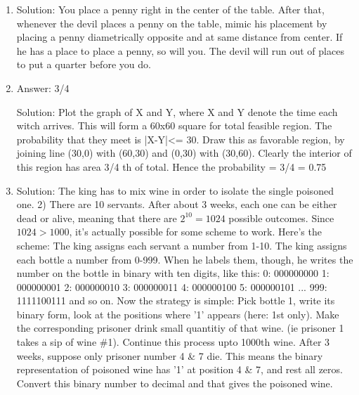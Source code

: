 \begin{enumerate}

\item
Solution: You place a penny right in the center of the table. After that, whenever the devil places a penny on the table, mimic his placement by placing a penny diametrically opposite and at same distance from center. If he has a place to place a penny, so will you. The devil will run out of places to put a quarter before you do.




\item
Answer: 3/4
 
Solution: Plot the graph of X and Y, where X and Y denote the time each witch arrives. This will form a 60x60 square for total feasible region. The probability that they meet is |X-Y|<= 30. Draw this as favorable region, by joining line (30,0) with (60,30) and (0,30) with (30,60). Clearly the interior of this region has area 3/4 th of total. Hence the probability = 3/4 = 0.75




\item
Solution: The king has to mix wine in order to isolate the single poisoned one. 2) There are 10 servants. After about 3 weeks, each one can be either dead or alive, meaning that there are $2^10 = 1024$ possible outcomes. Since $1024 > 1000$, it's actually possible for some scheme to work.
Here's the scheme: The king assigns each servant a number from 1-10. The king assigns each bottle a number from 0-999. When he labels them, though, he writes the number on the bottle in binary with ten digits, like this: 0: 000000000 1: 000000001 2: 000000010 3: 000000011 4: 000000100 5: 000000101 ... 999: 1111100111 and so on.
Now the strategy is simple: Pick bottle 1, write its binary form, look at the positions where '1' appears (here: 1st only). Make the corresponding prisoner drink small quantitiy of that wine. (ie prisoner 1 takes a sip of wine \#1). Continue this process upto 1000th wine. After 3 weeks, suppose only prisoner number 4 \& 7 die. This means the binary representation of poisoned wine has '1' at position 4 \& 7, and rest all zeros. Convert this binary number to decimal and that gives the poisoned wine.




\end{enumerate}
